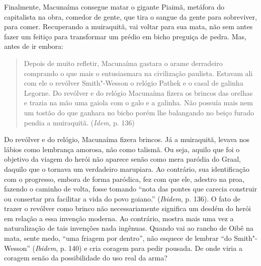 Finalmente, Macunaíma consegue matar o gigante Piaimã, metáfora do
capitalista na obra, comedor de gente, que tira o sangue da gente para
sobreviver, para comer. Recuperando a muiraquitã, vai voltar para sua
mata, não sem antes fazer um feitiço para transformar um prédio em bicho
preguiça de pedra. Mas, antes de ir embora:

\begin{quote}
Depois de muito refletir, Macunaíma gastara o arame derradeiro comprando
o que mais o entusiasmara na civilização paulista. Estavam ali com ele o
revólver Smith"-Wesson o relógio Pathek e o casal de galinha Legorne. Do
revólver e do relógio Macunaíma fizera os brincos das orelhas e trazia
na mão uma gaiola com o galo e a galinha. Não possuía mais nem um tostão
do que ganhara no bicho porém lhe balangando no beiço furado pendia a
muiraquitã. (\emph{Idem}, p. 136)
\end{quote}

Do revólver e do relógio, Macunaíma fizera brincos. Já a muiraquitã,
levava nos lábios como lembrança amorosa, não como talismã. Ou seja,
aquilo que foi o objetivo da viagem do herói não aparece senão como mera
paródia do Graal, daquilo que o tornava um verdadeiro marupiara. Ao
contrário, sua identificação com o progresso, embora de forma paródica,
fez com que ele, adestro na proa, fazendo o caminho de volta, fosse
tomando ``nota das pontes que carecia construir ou consertar pra
facilitar a vida do povo goiano.'' (\emph{Ibidem}, p. 136). O fato de
trazer o revólver como brinco não necessariamente significa um desdém do
herói em relação a essa invenção moderna. Ao contrário, mostra mais uma
vez a naturalização de tais invenções nada ingênuas. Quando vai ao
rancho de Oibê na mata, sente medo, ``uma friagem por dentro'', não
esquece de lembrar ``do Smith"-Wesson'' (\emph{Ibidem}, p. 140) e cria
coragem para pedir pousada. De onde viria a coragem senão da
possibilidade do uso real da arma?

